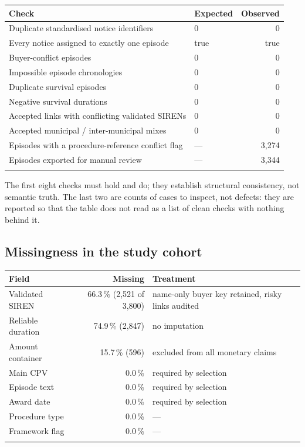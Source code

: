 \begin{longtable}[]{@{}llr@{}}
\toprule\noalign{}
Check & Expected & Observed \\
\midrule\noalign{}
\endhead
Duplicate standardised notice identifiers & 0 & 0 \\
Every notice assigned to exactly one episode & true & true \\
Buyer-conflict episodes & 0 & 0 \\
Impossible episode chronologies & 0 & 0 \\
Duplicate survival episodes & 0 & 0 \\
Negative survival durations & 0 & 0 \\
Accepted links with conflicting validated SIRENs & 0 & 0 \\
Accepted municipal / inter-municipal mixes & 0 & 0 \\
Episodes with a procedure-reference conflict flag & --- & 3,274 \\
Episodes exported for manual review & --- & 3,344 \\
\bottomrule\noalign{}
\end{longtable}

The first eight checks must hold and do; they establish structural consistency, not semantic truth. The last
two are counts of cases to inspect, not defects: they are reported so that the table does not read as a list
of clean checks with nothing behind it.

\subsection*{Missingness in the study cohort}

\begingroup
\setlength{\tabcolsep}{5pt}
\begin{longtable}[]{@{}lrl@{}}
\toprule\noalign{}
Field & Missing & Treatment \\
\midrule\noalign{}
\endhead
Validated SIREN & 66.3\,\% (2,521 of 3,800) & name-only buyer key retained, risky links audited \\
Reliable duration & 74.9\,\% (2,847) & no imputation \\
Amount container & 15.7\,\% (596) & excluded from all monetary claims \\
Main CPV & 0.0\,\% & required by selection \\
Episode text & 0.0\,\% & required by selection \\
Award date & 0.0\,\% & required by selection \\
Procedure type & 0.0\,\% & --- \\
Framework flag & 0.0\,\% & --- \\
\bottomrule\noalign{}
\end{longtable}
\endgroup

